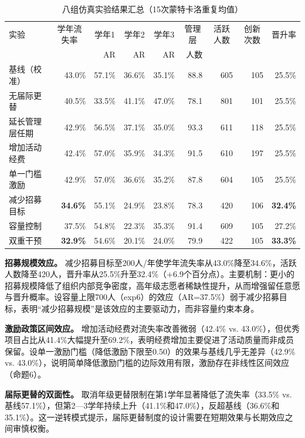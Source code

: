 \documentclass[12pt,a4paper]{article}
\begin{document}
\begin{table}[H]
\centering
\scriptsize
\caption{八组仿真实验结果汇总（15次蒙特卡洛重复均值）}
\label{tab:exp_results}
\begin{tabular}{lrrrrrrrr}
\toprule
实验 & \multicolumn{1}{c}{学年流失率} & \multicolumn{1}{c}{学年1} & \multicolumn{1}{c}{学年2} & \multicolumn{1}{c}{学年3} & \multicolumn{1}{c}{管理层} & \multicolumn{1}{c}{活跃人数} & \multicolumn{1}{c}{创新次数} & \multicolumn{1}{c}{晋升率} \\
 &  & AR & AR & AR & 人数 &  &  &  \\
\midrule
基线（校准） & 43.0\% & 57.1\% & 36.6\% & 35.1\% & 88.8 & 605 & 105 & 25.5\% \\
无届际更替 & 40.5\% & 33.5\% & 41.1\% & 47.0\% & 78.1 & 801 & 101 & 25.5\% \\
延长管理层任期 & 42.9\% & 56.5\% & 37.1\% & 35.0\% & 93.3 & 611 & 118 & 25.5\% \\
增加活动经费 & 42.4\% & 57.0\% & 35.9\% & 34.3\% & 91.5 & 610 & 197 & 25.5\% \\
单一门槛激励 & 42.9\% & 57.0\% & 36.6\% & 35.2\% & 87.8 & 604 & 105 & 25.5\% \\
减少招募目标 & \textbf{34.6\%} & 55.1\% & 24.9\% & 23.8\% & 78.3 & 420 & 106 & \textbf{32.4\%} \\
容量控制 & 37.5\% & 54.8\% & 22.3\% & 35.3\% & 91.4 & 609 & 105 & 27.2\% \\
双重干预 & \textbf{32.9\%} & 54.6\% & 20.1\% & 24.0\% & 79.9 & 422 & 105 & \textbf{33.3\%} \\
\bottomrule
\end{tabular}
\end{table}

\textbf{招募规模效应。} 减少招募目标至200人/年使学年流失率从43.0\%降至34.6\%，活跃人数降至420人，晋升率从25.5\%升至32.4\%（+6.9个百分点）。主要机制：更小的招募规模降低了组织内部竞争密度，高年级志愿者稀缺性提升，从而增强留任意愿与晋升概率。设容量上限700人（exp6）的效应（AR=37.5\%）弱于减少招募目标，表明“减少招募规模”是该效应的主要驱动力，而非容量约束本身。

\textbf{激励政策区间效应。} 增加活动经费对流失率改善微弱（42.4\% vs. 43.0\%），但优秀项目占比从41.4\%大幅提升至69.2\%，表明经费增加主要促进了活动质量而非成员保留。设单一激励门槛（降低激励下限至0.50）的效果与基线几乎无差异（42.9\% vs. 43.0\%），说明简单降低激励门槛的边际效用有限，激励存在非线性区间效应（命题6）。

\textbf{届际更替的双面性。} 取消年级更替限制在第1学年显著降低了流失率（33.5\% vs. 基线57.1\%），但第2—3学年持续上升（41.1\%和47.0\%），反超基线（36.6\%和35.1\%）。这一逆转模式提示，届际更替制度的设计需要在短期效果与长期效应之间审慎权衡。
\end{document}
